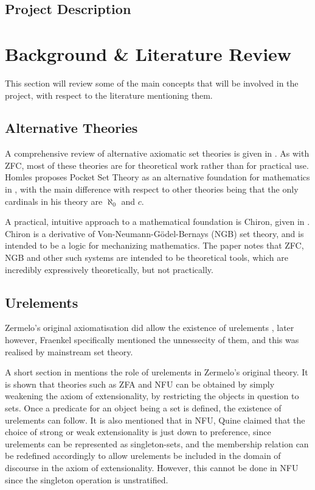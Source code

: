 \documentclass[12pt]{article}
\begin{document}
\subsection{Project Description}


\section{Background \& Literature Review}

This section will review some of the main concepts that will be involved in the project, with respect to the literature mentioning them.

\subsection{Alternative Theories}
A comprehensive review of alternative axiomatic set theories is given in \cite{ast}. As with ZFC, most of these theories are for theoretical work rather than for practical use. Homles proposes Pocket Set Theory as an alternative foundation for mathematics in \cite{pocket}, with the main difference with respect to other theories being that the only cardinals in his theory are $\aleph_0$ and $c$.

A practical, intuitive approach to a mathematical foundation is Chiron, given in \cite{chiron}. Chiron is a derivative of Von-Neumann-G\"odel-Bernays (NGB) set theory, and is intended to be a logic for mechanizing mathematics. The paper notes that ZFC, NGB and other such systems are intended to be theoretical tools, which are incredibly expressively theoretically, but not practically.

\subsection{Urelements}
Zermelo's original axiomatisation did allow the existence of urelements \cite{zermelo}, later however, Fraenkel specifically mentioned the unnessecity of them, and this was realised by mainstream set theory.

A short section in \cite{ast} mentions the role of urelements in Zermelo's original theory. It is shown that theories such as ZFA and NFU can be obtained by simply weakening the axiom of extensionality, by restricting the objects in question to sets. Once a predicate for an object being a set is defined, the existence of urelements can follow. It is also mentioned that in NFU, Quine claimed that the choice of strong or weak extensionality is just down to preference, since urelements can be represented as singleton-sets, and the membership relation can be redefined accordingly to allow urelements be included in the domain of discourse in the axiom of extensionality. However, this cannot be done in NFU since the singleton operation is unstratified.
\end{document}
